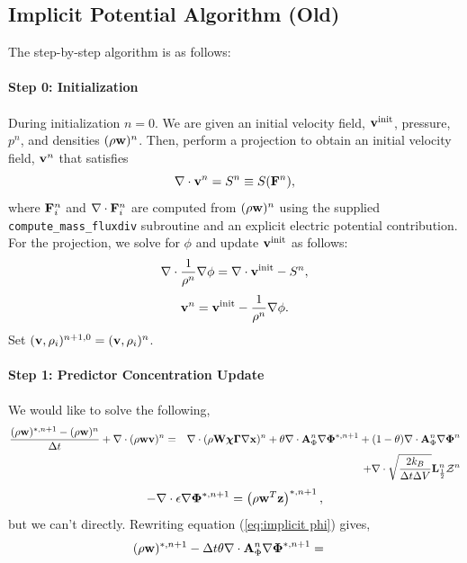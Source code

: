 \documentclass[final]{siamltex}
\def\Ab {{\bf A}}
\def\Fb {{\bf F}}
\def\Lb {{\bf L}}
\def\vb {{\bf v}}
\def\wb {{\bf w}}
\def\Wb {{\bf W}}
\def\xb {{\bf x}}
\def\zb {{\bf z}}
\def\chib   {\boldsymbol{\chi}}
\def\Gammab {\boldsymbol{\Gamma}}
\def\Phib   {\boldsymbol{\Phi}}
\def\half   {\frac{1}{2}}
\begin{document}
{\color{red}
\subsection{Implicit Potential Algorithm (Old)}
The step-by-step algorithm is as follows:\\ \\
{\bf Step 0: Initialization}\\ \\
During initialization $n=0$.
We are given an initial velocity field, $\vb^{\rm init}$, pressure, $p^n$,
and densities $(\rho\wb)^n$.
Then, perform a projection to obtain an initial velocity field, $\vb^n$ that satisfies
\begin{equation}
\nabla\cdot\vb^n = S^n \equiv S(\Fb^n),
\end{equation}
where $\Fb_i^n$ and $\nabla\cdot\Fb_i^n$ are computed from $(\rho\wb)^n$ using the 
supplied {\tt compute\_mass\_fluxdiv} subroutine and an explicit electric
potential contribution.
For the projection, we solve for $\phi$ and update $\vb^{\rm init}$ as follows:
\begin{equation}
\nabla\cdot\frac{1}{\rho^n}\nabla\phi = \nabla\cdot\vb^{\rm init} - S^n,
\end{equation}
\begin{equation}
\vb^n = \vb^{\rm init} - \frac{1}{\rho^n}\nabla\phi.
\end{equation}
Set $(\vb,\rho_i)^{n+1,0} = (\vb,\rho_i)^n$.\\ \\
{\bf Step 1: Predictor Concentration Update}\\ \\
We would like to solve the following,
\begin{eqnarray}
\frac{(\rho\wb)^{*,n+1} - (\rho\wb)^n}{\Delta t} + \nabla\cdot(\rho\wb\vb)^n &=&
\nabla\cdot(\rho\Wb\chib\Gammab\nabla\xb)^n + \theta\nabla\cdot \Ab_\Phi^n\nabla\Phib^{*,n+1} +
(1-\theta)\nabla\cdot \Ab_\Phi^n\nabla\Phib^n\nonumber\\
&&+ \nabla\cdot\sqrt{\frac{2k_B}{\Delta t\Delta V}}\Lb_\half^n\mathcal{Z}^n\label{eq:implicit phi}
\end{eqnarray}
\begin{equation}
-\nabla\cdot\epsilon\nabla\Phib^{*,n+1} = \left(\rho\wb^T\zb\right)^{*,n+1},\label{eq:constraint}
\end{equation}
but we can't directly.  Rewriting equation (\ref{eq:implicit phi}) gives,
\begin{eqnarray}
(\rho\wb)^{*,n+1} - \Delta t\theta\nabla\cdot \Ab_\Phi^n\nabla\Phib^{*,n+1} &=& \nonumber\\

\end{eqnarray}}
\end{document}
